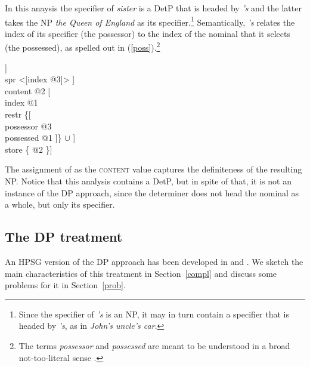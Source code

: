 \documentclass[output=paper
                ,modfonts
                ,nonflat
	        ,collection
	        ,collectionchapter
	        ,collectiontoclongg
 	        ,biblatex
                ,babelshorthands
                ,newtxmath
                ,draftmode
                ,colorlinks, citecolor=brown
]{./langsci/langscibook}
\begin{document}
In this anaysis the specifier of \emph{sister} is a DetP that is headed by \emph{'s} 
and the latter takes the NP \emph{the Queen of England} as its specifier.\footnote{Since the 
specifier of \emph{'s} is an NP, it may in turn contain a specifier that is headed 
by \emph{'s}, as in \emph{John's uncle's car}.}
Semantically, \emph{'s} relates the index of its specifier (the possessor) to the index
of the nominal that it selects (the possessed), as spelled out in (\ref{poss}).\footnote{The
terms \emph{possessor} and \emph{possessed} are meant to be understood in a broad not-too-literal 
sense \citep[--9]{Nerbonne92}.}     

\begin{exe} 
\ex\label{poss}
\begin{avm}
[category [head [\type{determiner}                \\
                 spec [\type{parameter}           \\
                       index @1                   \\
                       restr \avmbox{$\Sigma$} ]] \\
           spr <[index @3]> ]                     \\
 content @2 [                       \\
               index @1                           \\
               restr \{[           \\
                          possessor @3            \\
                          possessed @1 ]\} $\cup$ \avmbox{$\Sigma$} ] \\
 store \{ @2 \}]  
\end{avm}
\end{exe}

\noindent
The assignment of  as the \textsc{content} value captures 
the definiteness of the resulting NP. Notice that this analysis contains a DetP, 
but in spite of that, it is not an instance of the DP approach, since the 
determiner does not head the nominal as a whole, but only its specifier. 


\subsection{The DP treatment} 
\label{dpt} 


An HPSG version of the DP approach has been developed in \citet{Netter94} and 
\citet{Netter96a}. We sketch the main characteristics of this treatment in Section~\ref{compl}
and discuss some problems for it in Section~\ref{prob}. 
\end{document}
